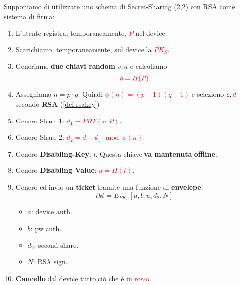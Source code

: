 \begin{corollary}\label{def:captureboost}
Supponiamo di utilizzare uno schema di Secret-Sharing (2,2) con RSA come sistema di firma:
\begin{enumerate}
        \item L'utente registra, temporaneamente, \textcolor{red}{$P$} nel device. 
        \item Scarichiamo, temporaneamente, sul device la \textcolor{red}{$PK_S$}.
        \item Generiamo \textbf{due chiavi random} $v,a$ e calcoliamo
        \[\textcolor{red}{b=H(P)}\]
        \item Assegniamo $n=p\cdot q$. Quindi \textcolor{red}{$\phi(n)=(p-1)(q-1)$} e seleziono $e,\textcolor{red}{d}$ secondo \textbf{RSA} (\cref{def:rsakey})
        \item Genero Share 1: \textcolor{red}{$d_1=PRF(v,P)$}.\footnotemark
        \item Genero Share 2: \textcolor{red}{$d_2=d-d_1\mod\phi(n)$}.
        \item Genero \textbf{Disabling-Key}: $t$. Questa chiave \textbf{va mantenuta offline}.
        \item Genero \textbf{Disabling Value}: \textcolor{red}{$u=H(t)$}.
        \item Genero ed invio un \textbf{ticket} tramite una funzione di \textbf{envelope}:
        \[tkt=E_{PK_S}[a,b,u,d_2,N]\]
        \begin{itemize}
            \item $a$: device auth.
            \item $b$: pw auth.
            \item $d_2$: second share.
            \item $N$: RSA sign.
        \end{itemize}
        \item \textbf{Cancello} dal device tutto ciò che è in \textcolor{red}{rosso}.
    \end{enumerate}
\end{corollary}
